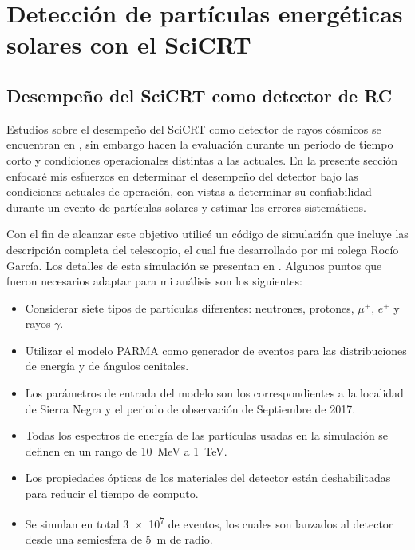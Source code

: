 
\chapter{Detección de partículas energéticas\\ solares con el SciCRT}
\label{chap:cuatro}
\section{Desempeño del SciCRT como detector de RC}

Estudios sobre el desempeño del SciCRT como detector de rayos cósmicos se encuentran en \cite{ynagai14,ysasai14}, sin embargo hacen la evaluación durante un periodo de tiempo corto y condiciones operacionales distintas a las actuales. En la presente sección enfocaré mis esfuerzos en determinar el desempeño del detector bajo las condiciones actuales de operación, con vistas a determinar su confiabilidad durante un evento de partículas solares y estimar los errores sistemáticos.

Con el fin de alcanzar este objetivo utilicé un código de simulación que incluye las descripción completa del telescopio, el cual fue desarrollado por mi colega Rocío García. Los detalles de esta simulación se presentan en \cite{garcia20}. Algunos puntos que fueron necesarios adaptar para mi análisis son los siguientes:

\begin{itemize}
  \item Considerar siete tipos de partículas diferentes: neutrones, protones, $\mu^{\pm}$, $e^{\pm}$ y rayos $\gamma$.
  \item Utilizar el modelo PARMA como generador de eventos para las distribuciones de energía y de ángulos cenitales.
  \item Los parámetros de entrada del modelo son los correspondientes a la localidad de Sierra Negra y el periodo de observación de Septiembre de \num{2017}.
  \item Todas los espectros de energía de las partículas usadas en la simulación se definen en un rango de \SI{10}{\mega\electronvolt} a \SI{1}{\tera\electronvolt}.
  \item Los propiedades ópticas de los materiales del detector están deshabilitadas para reducir el tiempo de computo.
  \item Se simulan en total \num{3e7} de eventos, los cuales son lanzados al detector desde una semiesfera de \SI{5}{\metre} de radio.
\end{itemize}

